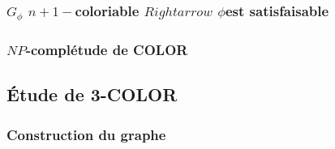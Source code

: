 \subsubsection{$G_\phi$ $n+1-$coloriable $Rightarrow$ $\phi$est satisfaisable}

\subsubsection{$NP$-complétude de COLOR}

\subsection{Étude de 3-COLOR}

\subsubsection{Construction du graphe}



